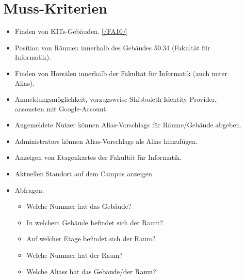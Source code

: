 \section{Muss-Kriterien}

\begin{itemize}

    \item \label{/MK10/}Finden von \Glspl{KIT}-Gebäuden. \ref{/FA10/}
    \item \label{/MK20/}Position von Räumen innerhalb des Gebäudes 50.34 (Fakultät für Informatik).
    \item \label{/MK30/}Finden von Hörsälen innerhalb der Fakultät für Informatik (auch unter Alias).
    \item \label{/MK40/}Anmeldungsmöglichkeit, vorzugsweise Shibboleth Identity Provider, ansonsten mit Google-Account.
    \item \label{/MK50/}Angemeldete Nutzer können \Glspl{Alias-Vorschlag} für Räume/Gebäude abgeben.
    \item \label{/MK60/}\Glspl{Administrator} können \Glspl{Alias-Vorschlag} als \Gls{Alias} hinzufügen.
    \item \label{/MK70/}Anzeigen von \Glspl{Etagenkarte} der Fakultät für Informatik.
    \item \label{/MK80/}Aktuellen Standort auf dem \Gls{Campus} anzeigen.
    \item Abfragen:
        \begin{itemize}
            \label{/MK90/}\item Welche Nummer hat das Gebäude?
            \label{/MK91/}\item In welchem Gebäude befindet sich der Raum?
            \label{/MK92/}\item Auf welcher Etage befindet sich der Raum?
            \label{/MK93/}\item Welche Nummer hat der Raum?
            \label{/MK94/}\item Welche \Glspl{Alias} hat das Gebäude/der Raum?
        \end{itemize}

\end{itemize}
